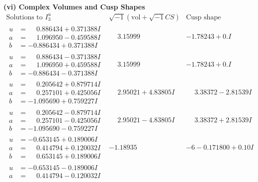 \documentclass[1p]{elsarticle_modified}
\theoremstyle{definition}
\newcommand{\I}{\sqrt{-1}}
\begin{document}
\newpage\flushleft \textbf{(vi) Complex Volumes and Cusp Shapes}
$$\begin{array}{c|c|c}  
\text{Solutions to }I^u_{3}& \I (\text{vol} + \sqrt{-1}CS) & \text{Cusp shape}\\
 \hline 
\begin{aligned}
u &= \phantom{-}0.886434 + 0.371388 I \\
a &= \phantom{-}1.096950 - 0.459588 I \\
b &= -0.886434 + 0.371388 I\end{aligned}
 & \phantom{-}3.15999\phantom{ +0.000000I} & -1.78243 + 0. I\phantom{ +0.000000I} \\ \hline\begin{aligned}
u &= \phantom{-}0.886434 - 0.371388 I \\
a &= \phantom{-}1.096950 + 0.459588 I \\
b &= -0.886434 - 0.371388 I\end{aligned}
 & \phantom{-}3.15999\phantom{ +0.000000I} & -1.78243 + 0. I\phantom{ +0.000000I} \\ \hline\begin{aligned}
u &= \phantom{-}0.205642 + 0.879714 I \\
a &= \phantom{-}0.257101 + 0.425056 I \\
b &= -1.095690 + 0.759227 I\end{aligned}
 & \phantom{-}2.95021 + 4.83805 I & \phantom{-}3.38372 - 2.81539 I \\ \hline\begin{aligned}
u &= \phantom{-}0.205642 - 0.879714 I \\
a &= \phantom{-}0.257101 - 0.425056 I \\
b &= -1.095690 - 0.759227 I\end{aligned}
 & \phantom{-}2.95021 - 4.83805 I & \phantom{-}3.38372 + 2.81539 I \\ \hline\begin{aligned}
u &= -0.653145 + 0.189006 I \\
a &= \phantom{-}0.414794 + 0.120032 I \\
b &= \phantom{-}0.653145 + 0.189006 I\end{aligned}
 & -1.18935\phantom{ +0.000000I} &                  -6
-0.171800 + 0. 10   I\phantom{ +0.000000I} \\ \hline\begin{aligned}
u &= -0.653145 - 0.189006 I \\
a &= \phantom{-}0.414794 - 0.120032 I \\

\end{aligned}
\end{array}$$
\end{document}
